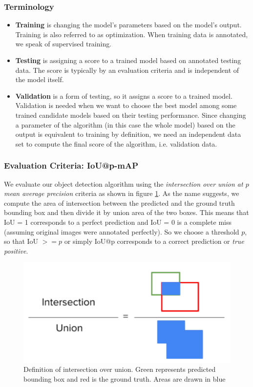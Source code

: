		\subsubsection{Terminology}
			\begin{itemize} 
				\item \textbf{Training} is changing the model's parameters based on the model's output. Training is also referred to as optimization. When training data is annotated, we speak of supervised training. 
				\item \textbf{Testing} is assigning a score to a trained model based on annotated testing data. The score is typically by an evaluation criteria and is independent of the model itself. 
				\item \textbf{Validation} is a form of testing, so it assigns a score to a trained model. Validation is needed when we want to choose the best model among some trained candidate models based on their testing performance. Since changing a parameter of the algorithm (in this case the whole model) based on the output is equivalent to training by definition, we need an independent data set to compute the final score of the algorithm, i.e. validation data. 
			\end{itemize}				
		
		\subsubsection{Evaluation Criteria: IoU@p-mAP}
		  We evaluate our object detection algorithm using the \textit{intersection over union at $p$ mean average precision} criteria as shown in figure \ref{fig:iou_def}. As the  name suggests, we compute the area of intersection between the predicted and the ground truth bounding box and then divide it by union area of the two boxes. This means that IoU = 1 corresponds to a perfect prediction and IoU = 0 is a complete miss (assuming original images were annotated perfectly). So we choose a threshold $p$, so that IoU $>= p$ or simply IoU@p corresponds to a correct prediction or \textit{true positive}. 		  

		\begin{figure}
			\centering
			\includegraphics[scale=.5]{images/iou_def.png}
			\caption{Definition of intersection over union. Green represents predicted bounding box and red is the ground truth. Areas are drawn in blue}
			\label{fig:iou_def}
		\end{figure}				  
		  
